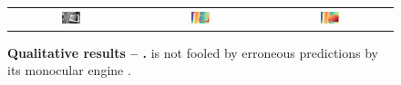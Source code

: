 \begin{figure}[t]
\begin{tabular}{ccc}
        \includegraphics[width=0.16\textwidth]{imgs/monotrap_samples/rgb/30.jpg} & 
        \includegraphics[width=0.16\textwidth]{imgs/monotrap_samples/mono/30.jpg} &
        \includegraphics[width=0.16\textwidth]{imgs/monotrap_samples/Ours/30.jpg} \\

        
    \end{tabular}\vspace{-0.2cm}
    \caption{\textbf{Qualitative results -- \dataset.} \method is not fooled by erroneous predictions by its monocular engine \cite{depth_anything_v2}. }
    \label{fig:qual_monotrap}\vspace{-0.3cm}
\end{figure}
